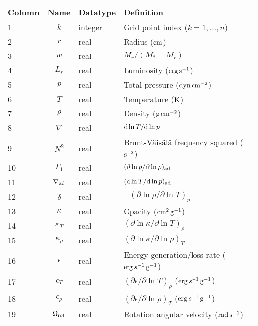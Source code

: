 \documentclass{article}
\newcommand{\diff}{\ensuremath{{\rm d}}}
\newcommand{\Mstar}{\ensuremath{M_{\ast}}}
\newcommand{\cm}{\ensuremath{{\rm cm}}}
\newcommand{\gram}{\ensuremath{{\rm g}}}
\newcommand{\second}{\ensuremath{{\rm s}}}
\newcommand{\dyne}{\ensuremath{{\rm dyn}}}
\newcommand{\erg}{\ensuremath{{\rm erg}}}
\newcommand{\kelvin}{\ensuremath{{\rm K}}}
\begin{document}
\begin{table}[h!]
\begin{tabular}{|l|c|l|l|} \hline
Column & Name & Datatype & Definition \\ \hline
1      & $k$ & integer & Grid point index ($k=1,\ldots,n$) \\
2      & $r$ & real    & Radius ($\cm$) \\
3      & $w$ & real    & $M_{r}/(\Mstar-M_{r})$ \\
4      & $L_{r}$ & real & Luminosity ($\erg\,\second^{-1}$) \\
5      & $p$ & real    & Total pressure ($\dyne\,\cm^{-2}$) \\
6      & $T$ & real    & Temperature ($\kelvin$) \\
7      & $\rho$ & real & Density ($\gram\,\cm^{-2}$) \\
8      & $\nabla$ & real & $\diff \ln T/\diff \ln p$ \\
9      & $N^{2}$ & real & Brunt-V\"ais\"al\"a frequency squared ($\second^{-2}$) \\
10     & $\Gamma_{1}$ & real & $(\partial \ln p/\partial \ln \rho)_{\rm ad}$ \\
11     & $\nabla_{\rm ad}$ & real & $(\diff \ln T/\diff \ln p)_{\rm ad}$ \\
12     & $\delta$ & real & $-(\partial \ln \rho/\partial \ln T)_{p}$  \\
13     & $\kappa$ & real & Opacity ($\cm^{2}\,\gram^{-1}$) \\
14     & $\kappa_{T}$ & real & $(\partial \ln \kappa/\partial \ln T)_{\rho}$ \\
15     & $\kappa_{\rho}$ & real & $(\partial \ln \kappa/\partial \ln \rho)_{T}$ \\
16     & $\epsilon$ & real & Energy generation/loss rate ($\erg\,s^{-1}\,\gram^{-1}$) \\
17     & $\epsilon_{T}$ & real & $(\partial \epsilon/\partial \ln T)_{\rho}$ ($\erg\,s^{-1}\,\gram^{-1}$) \\
18     & $\epsilon_{\rho}$ & real & $(\partial \epsilon/\partial \ln \rho)_{T}$ ($\erg\,s^{-1}\,\gram^{-1}$) \\
19     & $\Omega_{\rm rot}$ & real & Rotation angular velocity (${\rm rad}\,\second^{-1}$) \\  \hline
\end{tabular}
\end{table}
\end{document}
